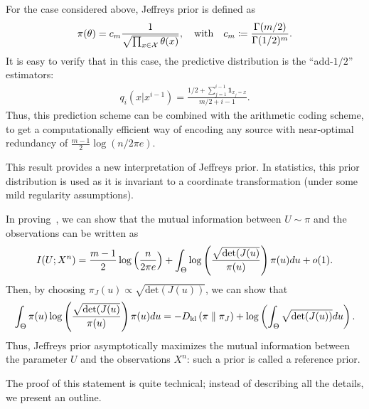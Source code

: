     \begin{remark}
        For the case considered above, Jeffreys prior is defined as 
        \begin{align}
            \pi(\theta) = c_m \frac{1}{\sqrt{\prod_{x \in \mathcal{X}} \theta(x)}}, \quad \text{with} \quad c_m \coloneqq \frac{\Gamma(m/2)}{\Gamma(1/2)^m}. 
        \end{align}
        It is easy to verify that in this case, the predictive distribution is the ``add-$1/2$'' estimators: 
        \begin{align}
            q_i(x|x^{i-1}) = \frac{1/2 + \sum_{j=1}^{i-1} \boldsymbol{1}_{x_j=x}}{m/2 + i-1}. 
        \end{align}
        Thus, this prediction scheme can be combined with the arithmetic coding scheme, to get a computationally efficient way of encoding any \iid source with near-optimal redundancy of $\frac{m-1}{2} \log(n/2\pi e)$. 
    \end{remark}
    \begin{remark}
        \label{remark:jeffreys-interpretation-1} This result provides a new interpretation of Jeffreys prior. In statistics, this prior distribution is used as it is invariant to a coordinate transformation (under some mild regularity assumptions). 

        In proving~, we can show that the mutual information between $U \sim \pi$ and the observations can be written as 
        \begin{align}
            I(U; X^n) = \frac{m-1}{2} \log \left( \frac{n}{2 \pi e} \right) + \int_{\Theta} \log \left( \frac{\sqrt{\text{det}(J(u)}}{\pi(u)} \right) \pi(u) du  + o(1). 
        \end{align}
        Then, by choosing $\pi_J(u) \propto \sqrt{\text{det}(J(u))}$, we can show that 
        \begin{align}
            \int_{\Theta} \pi(u) \log \left( \frac{\sqrt{\text{det}(J(u)}}{\pi(u)} \right) \pi(u) du = -D_{\text{kl}} \left( \pi \parallel \pi_J \right) + \log \left( \int_{\Theta} \sqrt{\text{det}(J(u))} du \right).  
        \end{align}
        Thus, Jeffreys prior asymptotically maximizes the mutual information between the parameter $U$ and the observations $X^n$: such a prior is called a reference prior.  
    \end{remark}
    
    The proof of this statement is quite technical; instead of describing all the details, we present an outline.  
